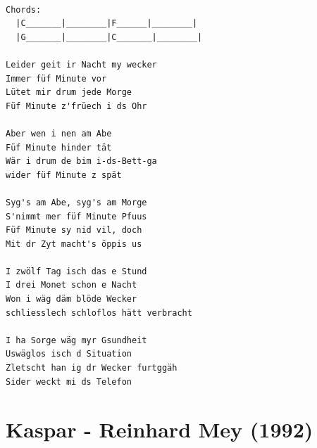 \documentclass[
]{book}
\let\stdsection\section
\renewcommand\section{\clearpage\stdsection}
\begin{document}
\begin{verbatim}

Chords:
  |C_______|________|F______|________|
  |G_______|________|C_______|________|

Leider geit ir Nacht my wecker
Immer füf Minute vor
Lütet mir drum jede Morge
Füf Minute z'früech i ds Ohr

Aber wen i nen am Abe
Füf Minute hinder tät
Wär i drum de bim i-ds-Bett-ga
wider füf Minute z spät

Syg's am Abe, syg's am Morge
S'nimmt mer füf Minute Pfuus
Füf Minute sy nid vil, doch
Mit dr Zyt macht's öppis us

I zwölf Tag isch das e Stund
I drei Monet schon e Nacht
Won i wäg däm blöde Wecker
schliesslech schloflos hätt verbracht

I ha Sorge wäg myr Gsundheit
Uswäglos isch d Situation
Zletscht han ig dr Wecker furtggäh
Sider weckt mi ds Telefon
\end{verbatim}

\hypertarget{mundart-und-deutsch-kaspar}{%
\section{Kaspar - Reinhard Mey (1992)}\label{mundart-und-deutsch-kaspar}}
\end{document}
